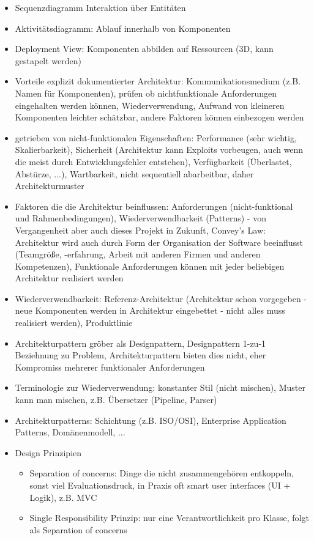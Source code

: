 \documentclass[paper=a4, fontsize=11pt]{scrartcl} %
\numberwithin{equation}{section} %
\numberwithin{figure}{section} %
\numberwithin{table}{section} %
\begin{document}
\begin{itemize}
  \item Sequenzdiagramm Interaktion über Entitäten
  \item Aktivitätsdiagramm: Ablauf innerhalb von Komponenten
  \item Deployment View: Komponenten abbilden auf Ressourcen (3D, kann gestapelt werden)
  \item Vorteile explizit dokumentierter Architektur: Kommunikationsmedium (z.B. Namen für Komponenten), prüfen ob nichtfunktionale Anforderungen eingehalten werden können, Wiederverwendung, Aufwand von kleineren Komponenten leichter schätzbar, andere Faktoren können einbezogen werden
  \item getrieben von nicht-funktionalen Eigenschaften: Performance (sehr wichtig, Skalierbarkeit), Sicherheit (Architektur kann Exploits vorbeugen, auch wenn die meist durch Entwicklungsfehler entstehen), Verfügbarkeit (Überlastet, Abstürze, ...), Wartbarkeit, nicht sequentiell abarbeitbar, daher Architekturmuster
  \item Faktoren die die Architektur beinflussen: Anforderungen (nicht-funktional und Rahmenbedingungen), Wiederverwendbarkeit (Patterns) - von Vergangenheit aber auch dieses Projekt in Zukunft, Convey's Law: Architektur wird auch durch Form der Organisation der Software beeinflusst (Teamgröße, -erfahrung, Arbeit mit anderen Firmen und anderen Kompetenzen), Funktionale Anforderungen können mit jeder beliebigen Architektur realisiert werden
  \item Wiederverwendbarkeit: Referenz-Architektur (Architektur schon vorgegeben - neue Komponenten werden in Architektur eingebettet - nicht alles muss realisiert werden), Produktlinie
  \item Architekturpattern gröber als Designpattern, Designpattern 1-zu-1 Beziehnung zu Problem, Architekturpattern bieten dies nicht, eher Kompromiss mehrerer funktionaler Anforderungen
  \item Terminologie zur Wiederverwendung: konstanter Stil (nicht mischen), Muster kann man mischen, z.B. Übersetzer (Pipeline, Parser)
  \item Architekturpatterns: Schichtung (z.B. ISO/OSI), Enterprise Application Patterns, Domänenmodell, ...
  \item Design Prinzipien
  \begin{itemize}
    \item Separation of concerns: Dinge die nicht zusammengehören entkoppeln, sonst viel Evaluationsdruck, in Praxis oft smart user interfaces (UI + Logik), z.B. MVC
    \item Single Responsibility Prinzip: nur eine Verantwortlichkeit pro Klasse, folgt als Separation of concerns

\end{itemize}
\end{itemize}
\end{document}
